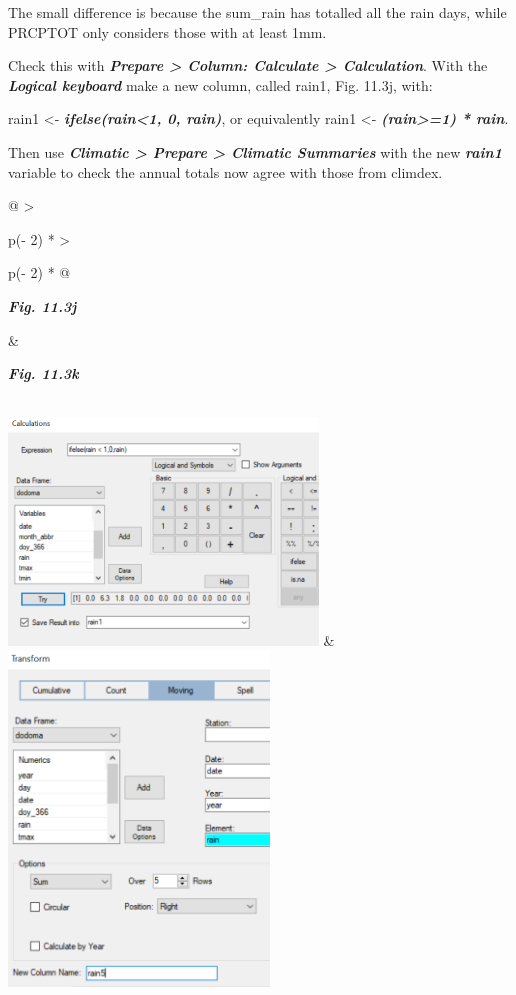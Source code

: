 \documentclass[
  letterpaper,
  DIV=11,
  numbers=noendperiod]{scrreprt}
\begin{document}
The small difference is because the sum\_rain has totalled all the rain
days, while PRCPTOT only considers those with at least 1mm.

Check this with \textbf{\emph{Prepare \textgreater{} Column: Calculate
\textgreater{} Calculation}}. With the \textbf{\emph{Logical keyboard}}
make a new column, called rain1, Fig. 11.3j, with:

rain1 \textless- \textbf{\emph{ifelse(rain\textless1, 0, rain)}}, or
equivalently rain1 \textless- \textbf{\emph{(rain\textgreater=1) *
rain}}.

Then use \textbf{\emph{Climatic \textgreater{} Prepare \textgreater{}
Climatic Summaries}} with the new \textbf{\emph{rain1}} variable to
check the annual totals now agree with those from climdex.

\begin{longtable}[]{@{}
  >{\raggedright\arraybackslash}p{(\columnwidth - 2\tabcolsep) * }
  >{\raggedright\arraybackslash}p{(\columnwidth - 2\tabcolsep) * }@{}}
\toprule\noalign{}
\begin{minipage}[b]{\linewidth}\raggedright
\textbf{\emph{Fig. 11.3j}}
\end{minipage} & \begin{minipage}[b]{\linewidth}\raggedright
\textbf{\emph{Fig. 11.3k}}
\end{minipage} \\
\midrule\noalign{}
\endhead
\bottomrule\noalign{}
\endlastfoot
\includegraphics[width=3.23706in,height=2.38342in]{figures/Fig11.3j.png}
&
\includegraphics[width=2.73123in,height=3.50223in]{figures/Fig11.3k.png} \\
\end{longtable}
\end{document}
